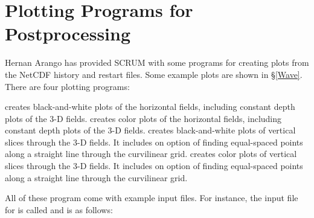 \section{Plotting Programs for Postprocessing}
\label{Plothist}
Hernan Arango has provided SCRUM with some programs for creating plots
from the NetCDF history and restart files. Some example plots are shown
in \S\ref{Wave}. There are four plotting programs:
\begin{klist}
    creates black-and-white plots of the horizontal fields,
including constant depth plots of the 3-D fields.
    creates color plots of the horizontal fields,
including constant depth plots of the 3-D fields.
    creates black-and-white plots of vertical slices through
the 3-D fields.  It includes on option of finding equal-spaced points
along a straight line through the curvilinear grid.
    creates color plots of vertical slices through
the 3-D fields.  It includes on option of finding equal-spaced points
along a straight line through the curvilinear grid.
\end{klist}
All of these program come with example input files.  For instance, the
input file for  is called  and is as follows:
